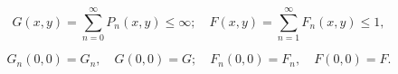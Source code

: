 $$G(x,y) = \sum_{n=0}^{\infty} P_n(x,y) \leq \infty; \quad F(x,y) = \sum_{n=1}^{\infty} F_n(x,y) \leq 1,$$

$$G_n(0,0) = G_n, \quad G(0,0) = G; \quad F_n(0,0) = F_n, \quad F(0,0) = F.$$